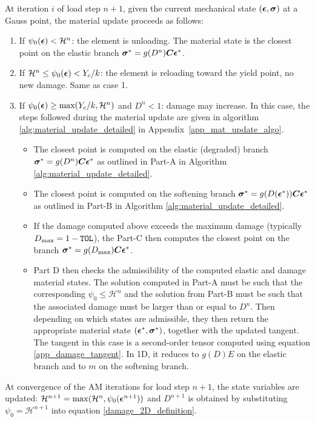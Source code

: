 \documentclass[10pt,review]{cas-sc}
\begin{document}
At iteration $i$ of load step $n+1$, given the current mechanical state $(\mbox{\boldmath $\epsilon$},\mbox{\boldmath $\sigma$})$ at a Gauss point, the material update proceeds as follows:
\begin{enumerate}
	\item If $\psi_0(\mbox{\boldmath $\epsilon$}) < \mathcal{H}^n$: the element is unloading. The material state is the closest point on the elastic branch $\mbox{\boldmath $\sigma$}^* = g(D^n) \mbox{\boldmath $C$} \mbox{\boldmath $\epsilon$}^*$.
	\item If $\mathcal{H}^n \leq \psi_0(\mbox{\boldmath $\epsilon$}) < Y_c/k$: the element is reloading toward the yield point, no new damage. Same as case 1.
	\item If $\psi_0(\mbox{\boldmath $\epsilon$}) \geq \max(Y_c/k,\mathcal{H}^n)$ and $D^n < 1$: damage may increase. In this case, the steps followed during the material update are given in algorithm \ref{alg:material_update_detailed} in Appendix~\ref{app_mat_update_algo}. 
	\begin{itemize}
		\item The closest point is computed on the elastic (degraded) branch $\mbox{\boldmath $\sigma$}^* = g(D^n) \mbox{\boldmath $C$} \mbox{\boldmath $\epsilon$}^*$ as outlined in Part-A in Algorithm \ref{alg:material_update_detailed}. 
		\item The closest point is computed on the softening branch $\mbox{\boldmath $\sigma$}^* = g(D(\mbox{\boldmath $\epsilon$}^*)) \mbox{\boldmath $C$} \mbox{\boldmath $\epsilon$}^*$ as outlined in Part-B in Algorithm \ref{alg:material_update_detailed}.
		\item If the damage computed above exceeds the maximum damage (typically $D_{\rm max}=1-\texttt{TOL}$), the Part-C then computes the closest point on the branch $\mbox{\boldmath $\sigma$}^* = g(D_{\rm max}) \mbox{\boldmath $C$} \mbox{\boldmath $\epsilon$}^*$. 
		\item Part D then checks the admissibility of the computed elastic and damage material states. The solution computed in Part-A must be such that the corresponding $\psi_0 \leq \mathcal{H}^n$ and the solution from Part-B must be such that the associated damage must be larger than or equal to $D^n$. Then depending on which states are admissible, they then return the appropriate material state $(\mbox{\boldmath $\epsilon$}^*, \mbox{\boldmath $\sigma$} ^*)$, together with the updated tangent. The tangent in this case is a second-order tensor computed using equation \ref{app_damage_tangent}. In 1D, it reduces to $g(D)E$ on the elastic branch and to $m$ on the softening branch.
	\end{itemize}
\end{enumerate}


At convergence of the AM iterations for load step $n+1$, the state variables are updated: $\mathcal{H}^{n+1} = \max(\mathcal{H}^n, \psi_0(\mbox{\boldmath $\epsilon$}^{n+1}))$ and  $D^{n+1}$ is obtained by substituting $\psi_0 = \mathcal{H}^{n+1}$ into equation \ref{damage_2D_definition}.
\end{document}
